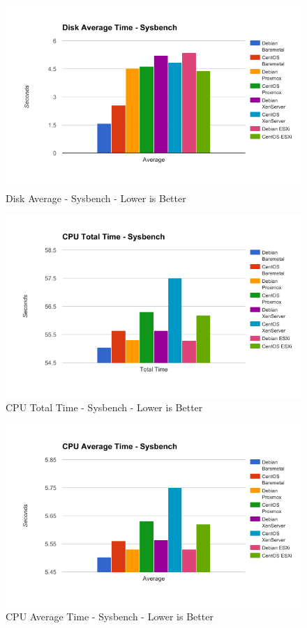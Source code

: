 \documentclass[12pt]{spieman}  %
\begin{document}
\begin{figure}[H]
\caption{Disk Average - Sysbench - Lower is Better}
\centering
\includegraphics[width=\textwidth,keepaspectratio]{Graphs/Disk-Average-Sysbench}
\end{figure}

\begin{figure}[H]
\caption{CPU Total Time - Sysbench - Lower is Better}
\centering
\includegraphics[width=\textwidth,keepaspectratio]{Graphs/CPU-Total-Sysbench}
\end{figure}

\begin{figure}[H]
\caption{CPU Average Time - Sysbench - Lower is Better}
\centering
\includegraphics[width=\textwidth,keepaspectratio]{Graphs/CPU-Average-Sysbench}
\end{figure}
\end{document}
